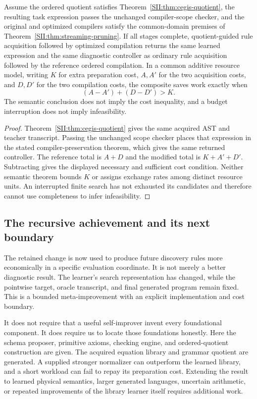 \begin{SIIproposition}\label{SII:prop:meta-chain}
Assume the ordered quotient satisfies Theorem~\ref{SII:thm:cegis-quotient}, the resulting task expression passes the unchanged compiler-scope checker, and the original and optimized compilers satisfy the common-domain premises of Theorem~\ref{SII:thm:streaming-pruning}. If all stages complete, quotient-guided rule acquisition followed by optimized compilation returns the same learned expression and the same diagnostic controller as ordinary rule acquisition followed by the reference ordered compilation. In a common additive resource model, writing $K$ for extra preparation cost, $A,A'$ for the two acquisition costs, and $D,D'$ for the two compilation costs, the composite saves work exactly when
\[
 (A-A')+(D-D')>K.
\]
The semantic conclusion does not imply the cost inequality, and a budget interruption does not imply infeasibility.
\end{SIIproposition}
\begin{proof}
Theorem~\ref{SII:thm:cegis-quotient} gives the same acquired AST and teacher transcript. Passing the unchanged scope checker places that expression in the stated compiler-preservation theorem, which gives the same returned controller. The reference total is $A+D$ and the modified total is $K+A'+D'$. Subtracting gives the displayed necessary and sufficient cost condition. Neither semantic theorem bounds $K$ or assigns exchange rates among distinct resource units. An interrupted finite search has not exhausted its candidates and therefore cannot use completeness to infer infeasibility.
\end{proof}

\subsection{The recursive achievement and its next boundary}
The retained change is now used to produce future discovery rules more economically in a specific evaluation coordinate. It is not merely a better diagnostic result. The learner's search representation has changed, while the pointwise target, oracle transcript, and final generated program remain fixed. This is a bounded meta-improvement with an explicit implementation and cost boundary.

It does not require that a useful self-improver invent every foundational component. It does require us to locate those foundations honestly. Here the schema proposer, primitive axioms, checking engine, and ordered-quotient construction are given. The acquired equation library and grammar quotient are generated. A supplied stronger normalizer can outperform the learned library, and a short workload can fail to repay its preparation cost. Extending the result to learned physical semantics, larger generated languages, uncertain arithmetic, or repeated improvements of the library learner itself requires additional work.


